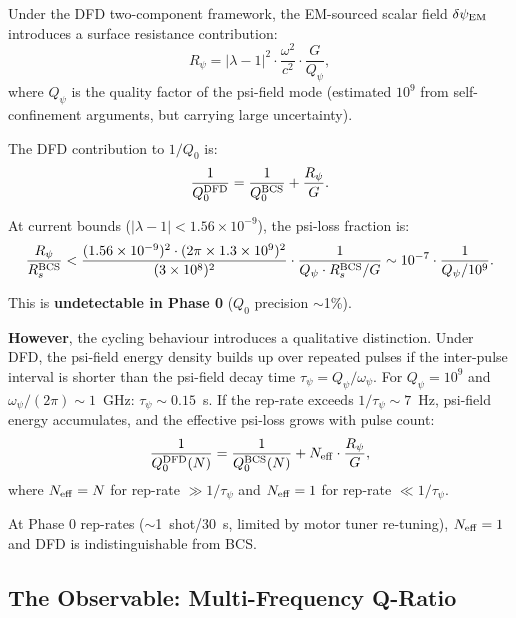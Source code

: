\documentclass[11pt]{article}
\newcommand{\ee}[1]{\times 10^{#1}}
\newcommand{\dpsiEM}{\delta\psi_{\rm EM}}
\newcommand{\Qpsi}{Q_\psi}
\newcommand{\Qzero}{Q_0}
\begin{document}
Under the DFD two-component framework, the EM-sourced scalar field
$\dpsiEM$ introduces a surface resistance contribution:
\begin{equation}
R_\psi = |\lambda - 1|^2 \cdot \frac{\omega^2}{c^2}
\cdot \frac{G}{\Qpsi},
\label{eq:r-psi}
\end{equation}
where $\Qpsi$ is the quality factor of the psi-field mode (estimated
$10^9$ from self-confinement arguments, but carrying large
uncertainty).

The DFD contribution to $1/\Qzero$ is:
\begin{equation}
\frac{1}{\Qzero^{\rm DFD}} = \frac{1}{\Qzero^{\rm BCS}}
+ \frac{R_\psi}{G}.
\label{eq:q-dfd}
\end{equation}

At current bounds ($|\lambda - 1| < 1.56\ee{-9}$), the psi-loss
fraction is:
\begin{equation}
\frac{R_\psi}{R_s^{\rm BCS}} < \frac{(1.56\ee{-9})^2
\cdot (2\pi \times 1.3\ee{9})^2}{(3\ee{8})^2}
\cdot \frac{1}{\Qpsi \cdot R_s^{\rm BCS}/G}
\sim 10^{-7} \cdot \frac{1}{\Qpsi/10^9}.
\label{eq:psi-fraction}
\end{equation}

This is \textbf{undetectable in Phase 0} ($\Qzero$ precision $\sim$1\%).

\textbf{However}, the cycling behaviour introduces a qualitative
distinction. Under DFD, the psi-field energy density builds up over
repeated pulses if the inter-pulse interval is shorter than the
psi-field decay time $\tau_\psi = \Qpsi / \omega_\psi$. For
$\Qpsi = 10^9$ and $\omega_\psi / (2\pi) \sim 1$~GHz:
$\tau_\psi \sim 0.15$~s. If the rep-rate exceeds $1/\tau_\psi
\sim 7$~Hz, psi-field energy accumulates, and the effective psi-loss
grows with pulse count:
\begin{equation}
\frac{1}{\Qzero^{\rm DFD}(N)} = \frac{1}{\Qzero^{\rm BCS}(N)}
+ N_{\rm eff} \cdot \frac{R_\psi}{G},
\label{eq:dfd-cycling}
\end{equation}
where $N_{\rm eff} = N$ for rep-rate $\gg 1/\tau_\psi$ and
$N_{\rm eff} = 1$ for rep-rate $\ll 1/\tau_\psi$.

At Phase 0 rep-rates ($\sim$1~shot/30~s, limited by motor tuner
re-tuning), $N_{\rm eff} = 1$ and DFD is indistinguishable from BCS.

\subsection{The Observable: Multi-Frequency Q-Ratio}
\end{document}
